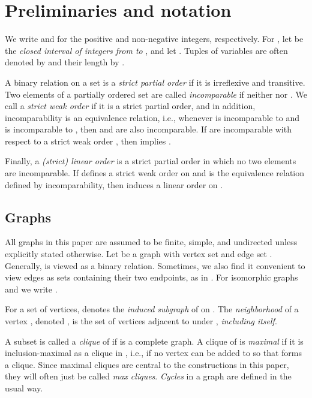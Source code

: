 \documentclass[10pt]{article}
\theoremstyle{remark}
\theoremstyle{definition}
\theoremstyle{plain}
\begin{document}
\section{Preliminaries and notation}

We write  and  for the positive and non-negative integers, respectively. For , let  be the \emph{closed interval of integers from  to }, and let . Tuples of variables  are often denoted by  and their length by .



A binary relation  on a set  is a \emph{strict partial order} if it is irreflexive and transitive. Two elements  of a partially ordered set  are called \emph{incomparable} if neither  nor . We call  a \emph{strict weak order} if it is a strict partial order, and in addition, incomparability is an equivalence relation, i.e., whenever  is incomparable to  and  is incomparable to , then  and  are also incomparable. If  are incomparable with respect to a strict weak order , then  implies .

Finally, a \emph{(strict) linear order} is a strict partial order in which no two elements are incomparable. If  defines a strict weak order on  and  is the equivalence relation defined by incomparability, then  induces a linear order on .


\subsection{Graphs}

All graphs in this paper are assumed to be finite, simple, and undirected unless explicitly stated otherwise. Let  be a graph with vertex set  and edge set . Generally,  is viewed as a binary relation. Sometimes, we also find it convenient to view edges  as sets containing their two endpoints, as in . For isomorphic graphs  and  we write .

For  a set of vertices,  denotes the \emph{induced subgraph} of  on . The \emph{neighborhood} of a vertex , denoted , is the set of vertices adjacent to  under , \emph{including  itself}.

A subset  is called a \emph{clique} of  if  is a complete graph. A clique  of  is \emph{maximal} if it is inclusion-maximal as a clique in , i.e., if no vertex  can be added to  so that  forms a clique. Since maximal cliques are central to the constructions in this paper, they will often just be called \emph{max cliques}. \emph{Cycles} in a graph are defined in the usual way.
\end{document}
